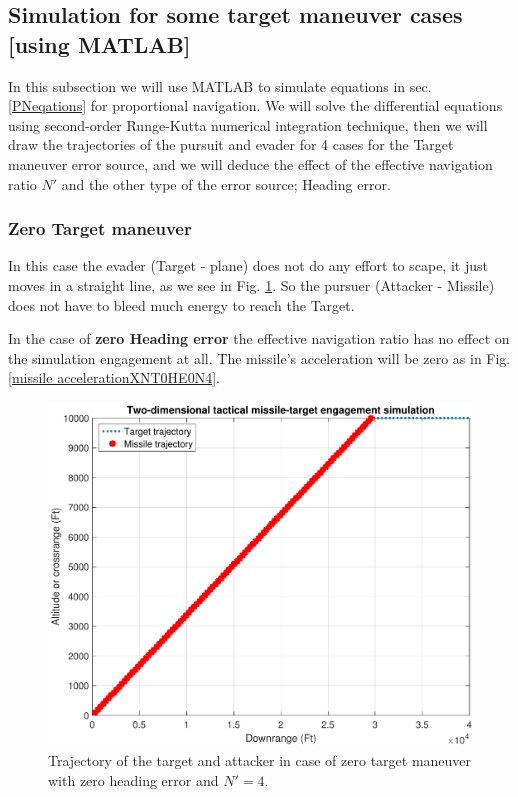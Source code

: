 \subsection{Simulation for some target maneuver cases [using MATLAB]}
In this subsection we will use MATLAB to simulate equations in sec. \ref{PNeqations} for proportional navigation. We will solve the differential equations using second-order Runge-Kutta numerical integration technique, then we will draw the trajectories of the pursuit and evader for 4 cases for the Target maneuver error source, and we will deduce the effect of the effective navigation ratio $N'$ and the other type of the error source; Heading error. 
\subsubsection{Zero Target maneuver}
In this case the evader (Target - plane) does not do any effort to scape, it just moves in a straight line, as we see in Fig. \ref{trajectoryXNT0HE0N4}. So the pursuer (Attacker - Missile) does not have to bleed much energy to reach the Target.

In the case of \textbf{zero Heading error} the effective navigation ratio has no effect on the simulation engagement at all. The missile's acceleration will be zero as in Fig. \ref{missile accelerationXNT0HE0N4}.

\begin{figure}[H]
	\centering
	\includegraphics[scale = 0.7]{fig/trajectoryXNT0HE0N4.pdf}
	\caption{Trajectory of the target and attacker in case of zero target maneuver with zero heading error and $N'=4$.}
	\label{trajectoryXNT0HE0N4}
\end{figure}


